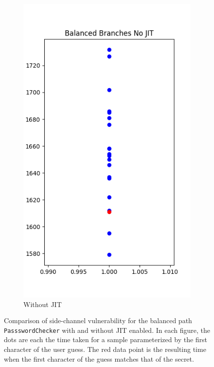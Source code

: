 \begin{figure}
\begin{subfigure}{.5\textwidth}
  \includegraphics[width=.7\linewidth]{figures/nJITbranch1.png}
  \caption{Without JIT}
  \label{fig:sub2}
\end{subfigure}
\caption{Comparison of side-channel vulnerability for the balanced path \texttt{PassswordChecker} with and without JIT enabled. In each figure, the dots are each the time taken for a sample parameterized by the first character of the user guess. The red data point is the resulting time when the first character of the guess matches that of the secret.}
\label{fig:test}
\end{figure}

